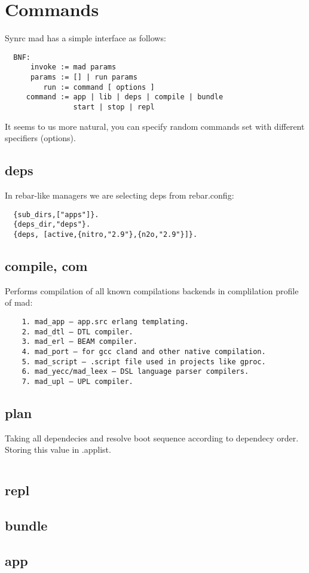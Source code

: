 \section{Commands}

Synrc mad has a simple interface as follows:

\vspace{1\baselineskip}
\begin{lstlisting}
  BNF:
      invoke := mad params
      params := [] | run params
         run := command [ options ]
     command := app | lib | deps | compile | bundle
                start | stop | repl
\end{lstlisting}
\vspace{1\baselineskip}

It seems to us more natural, you can specify random
commands set with different specifiers (options).

\subsection{deps}

In rebar-like managers we are selecting deps from rebar.config:
\vspace{1\baselineskip}
\begin{lstlisting}
  {sub_dirs,["apps"]}.
  {deps_dir,"deps"}.
  {deps, [active,{nitro,"2.9"},{n2o,"2.9"}]}.
\end{lstlisting}
\vspace{1\baselineskip}


\subsection{compile, com}
Performs compilation of all known compilations backends in complilation profile of mad:
\vspace{1\baselineskip}
\begin{lstlisting}
    1. mad_app — app.src erlang templating.
    2. mad_dtl — DTL compiler.
    3. mad_erl — BEAM compiler.
    4. mad_port — for gcc cland and other native compilation.
    5. mad_script — .script file used in projects like gproc.
    6. mad_yecc/mad_leex — DSL language parser compilers.
    7. mad_upl — UPL compiler.
\end{lstlisting}
\vspace{1\baselineskip}

\subsection{plan}
Taking all dependecies and resolve boot sequence according to dependecy order. Storing this value in .applist.
\vspace{1\baselineskip}
\begin{lstlisting}
\end{lstlisting}
\vspace{1\baselineskip}

\subsection{repl}

\subsection{bundle}

\subsection{app}

